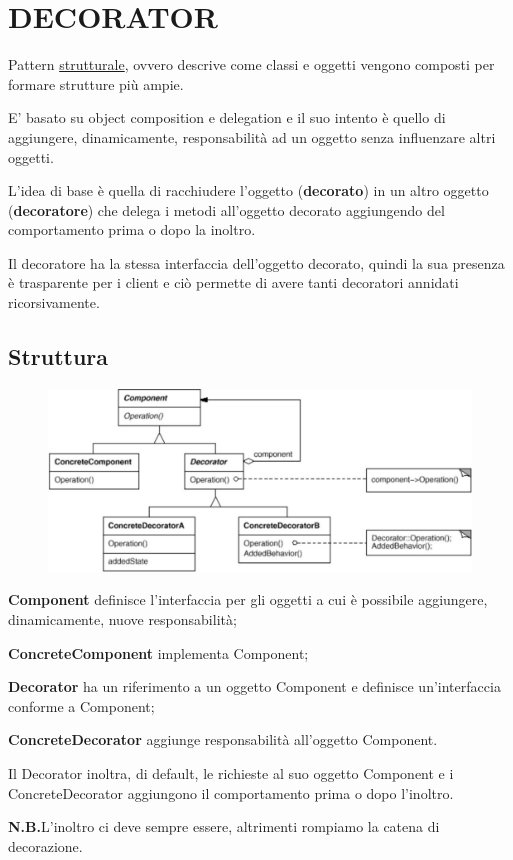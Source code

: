 \chapter{DECORATOR}

Pattern \underline{strutturale}, ovvero descrive come classi e oggetti vengono composti per formare strutture più ampie. 

E' basato su object composition e delegation e il suo intento è quello di aggiungere, dinamicamente, responsabilità ad un oggetto senza influenzare altri oggetti.
\smallskip

L'idea di base è quella di racchiudere l'oggetto (\textbf{decorato}) in un altro oggetto (\textbf{decoratore}) che delega i metodi all'oggetto decorato aggiungendo del 
comportamento prima o dopo la inoltro.

Il decoratore ha la stessa interfaccia dell’oggetto decorato, quindi la sua presenza è trasparente per i client e ciò permette di avere tanti decoratori annidati
ricorsivamente.
\section{Struttura}

\begin{figure}[H]
    \centering
    \includegraphics[width=0.5\linewidth]{../../immagini/decorator/struttura_decorator}    
\end{figure}

\textbf{Component} definisce l'interfaccia per gli oggetti a cui è possibile aggiungere, dinamicamente, nuove responsabilità;

\textbf{ConcreteComponent} implementa Component;

\textbf{Decorator} ha un riferimento a un oggetto Component e definisce un'interfaccia conforme a Component;

\textbf{ConcreteDecorator} aggiunge responsabilità all'oggetto Component.
\medskip

Il Decorator inoltra, di default, le richieste al suo oggetto Component e i ConcreteDecorator aggiungono il comportamento prima o dopo l'inoltro.

\medskip
\textbf{N.B.}L'inoltro ci deve sempre essere, altrimenti rompiamo la catena di decorazione.
\medskip

